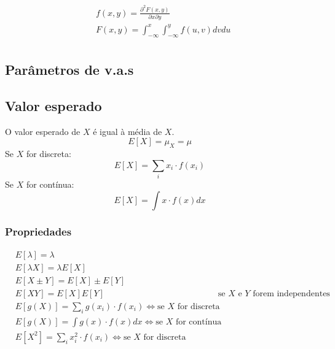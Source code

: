 \documentclass[a4paper]{article}
\begin{document}
\begin{multicols}{3}
\begin{align*}
  &f(x, y) = \frac{\partial^2 F(x, y)}{\partial x \partial y} \\
  &F(x, y) = \int_{-\infty}^x \int_{-\infty}^y f(u, v) dv du \\
\end{align*}

\subsection{Parâmetros de v.a.s}
\subsection{Valor esperado}
O valor esperado de $X$ é igual à média de $X$.
$$E[X] = \mu_X = \mu$$
Se $X$ for discreta:
$$E[X] = \sum_i x_i \cdot f(x_i)$$
Se $X$ for contínua:
$$E[X] = \int x \cdot f(x) dx$$
\subsubsection{Propriedades}
\begin{align*}
  &E[\lambda] = \lambda \\
  &E[\lambda X] = \lambda E[X] \\
  &E[X \pm Y] = E[X] \pm E[Y] \\
  &E[X Y] = E[X] E[Y] & \text{se } X \text{ e } Y \text{ forem independentes} \\
  &E[g(X)] = \sum_i g(x_i) \cdot f(x_i) \iff \text{se } X \text{ for discreta} \\
  &E[g(X)] = \int g(x) \cdot f(x) dx \iff \text{se } X \text{ for contínua} \\
  &E[X^2] = \sum_i x_i^2 \cdot f(x_i) \iff \text{se } X \text{ for discreta}
\end{align*}

\end{multicols}
\end{document}
